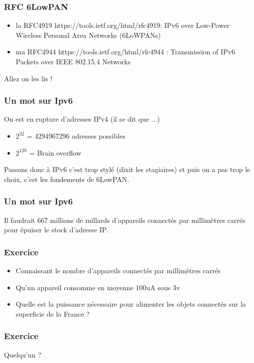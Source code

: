 \documentclass{smilebeamer}
\begin{document}
\begin{frame}
\frametitle{RFC 6LowPAN} 
\begin{itemize}
\item la RFC4919 https://tools.ietf.org/html/rfc4919: IPv6 over Low-Power Wireless Personal Area Networks (6LoWPANs)
\item ma RFC4944 https://tools.ietf.org/html/rfc4944 :  Transmission of IPv6 Packets over IEEE 802.15.4 Networks
\end{itemize}

Allez on les lis !

\end{frame}

\begin{frame}
\frametitle{Un mot sur Ipv6}

On est en rupture d'adresses IPv4 (il se dit que ...)
\newline 
\begin{itemize}
\item $2^{32}$ = 4294967296 adresses possibles
\item $2^{128}$ = Brain overflow
\end{itemize}
 
Passons donc à IPv6 c'est trop stylé (dixit les stagiaires) et puis on
a pas trop le choix, c'est les fondements de 6LowPAN.

\end{frame}

\begin{frame}
\frametitle{Un mot sur Ipv6}

Il faudrait 667 millions de millards d'appareils connectés par millimètres carrés pour épuiser le stock d'adresse IP.

\end{frame}


\begin{frame}
\frametitle{Exercice}
\begin{itemize}
\item Connaissant le nombre d'appareils connectés par millimètres carrés
\item Qu'un appareil consomme en moyenne 100uA sous 3v
\item Quelle est la puissance nécessaire pour alimenter les objets connectés sur la superficie de la France ?
\end{itemize}
\end{frame}

\begin{frame}
\frametitle{Exercice}

Quelqu'un ?

\end{frame}
\end{document}
